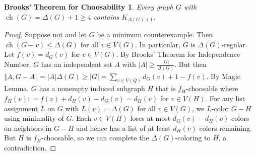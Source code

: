 \documentclass[12pt]{article}
\theoremstyle{plain}
\newtheorem*{BrooksTheoremOnline}{Brooks' Theorem for Choosability}
\theoremstyle{definition}
\theoremstyle{remark}
\newcommand{\size}[1]{\left\Vert#1\right\Vert}
\newcommand{\DefinedAs}{\mathrel{\mathop:}=}
\newcommand{\ch}{\operatorname{ch}}
\begin{document}
\begin{BrooksTheoremOnline}
	Every graph $G$ with $\ch(G) = \Delta(G) + 1 \geq 4$ contains $K_{\Delta(G) + 1}$.
\end{BrooksTheoremOnline}
\begin{proof}
	Suppose not and let $G$ be a minimum counterexample.  Then $\ch(G - v) \le \Delta(G)$ for all $v \in V(G)$. In particular, $G$ is $\Delta(G)$-regular.  Let $f(v) = d_G(v)$ for $v \in V(G)$. By Brooks' Theorem for Independence Number, $G$ has an independent set $A$ with $|A| \ge \frac{|G|}{\Delta(G)}$.  But then $\size{A, G-A} = |A|\Delta(G) \ge |G| = \sum_{v \in V(Q)} d_G(v) + 1 - f(v)$.  By Magic Lemma, $G$ has a nonempty induced subgraph $H$ that is $f_H$-choosable where $f_H(v) \DefinedAs f(v) + d_H(v) - d_G(v) = d_H(v)$ for $v \in V(H)$. For any list assignment $L$ on $G$ with $L(v) = \Delta(G)$ for all $v \in V(G)$, we $L$-color $G-H$ using minimality of $G$.  Each $v \in V(H)$ loses at most $d_G(v) - d_H(v)$ colors on neighbors in $G-H$ and hence has a list of at least $d_H(v)$ colors remaining.  But $H$ is $f_H$-choosable, so we can complete the $\Delta(G)$-coloring to $H$, a contradiction.
\end{proof}
\end{document}
